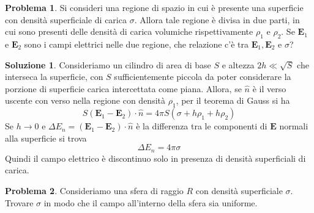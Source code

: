 \documentclass[a4paper,11pt]{book}
\renewcommand{\vec}[1]{\mathbf{#1}}
\theoremstyle{theorem}
\theoremstyle{definition}
\newtheorem{problema}{Problema}[section]
\newtheorem{soluzione}{Soluzione}[section]
\begin{document}
\begin{problema}
	\label{deltae}
	Si consideri una regione di spazio in cui è presente una superficie con densità superficiale di carica $\sigma$. Allora tale regione è divisa in due parti, in cui sono presenti delle densità di carica volumiche rispettivamente $\rho_1$ e $\rho_2$. Se $\vec{E}_1$ e $\vec{E}_2$ sono i campi elettrici nelle due regione, che relazione c'è tra $\vec{E}_1,\vec{E}_2$ e $\sigma$?
\end{problema}
\begin{soluzione}
	Consideriamo un cilindro di area di base $S$ e altezza $2h\ll\sqrt{S}$ che interseca la superficie, con $S$ sufficientemente piccola da poter considerare la porzione di superficie carica intercettata come piana. Allora, se $\hat{n}$ è il verso uscente con verso nella regione con densità $\rho_1$, per il teorema di Gauss si ha
	\[S\left(\vec{E}_1-\vec{E}_2\right)\cdot\hat{n}=4\pi S\left(\sigma+h\rho_1+h\rho_2\right)\]
	Se $h\to0$ e $\Delta E_n=\left(\vec{E}_1-\vec{E}_2\right)\cdot\hat{n}$ è la differenza tra le componenti di $\vec{E}$ normali alla superficie si trova
	\[\Delta E_n=4\pi\sigma\]
	Quindi il campo elettrico è discontinuo solo in presenza di densità superficiali di carica.
\end{soluzione}
\begin{problema}
	Consideriamo una sfera di raggio $R$ con densità superficiale $\sigma$. Trovare $\sigma$ in modo che il campo all'interno della sfera sia uniforme.
\end{problema}
\end{document}
